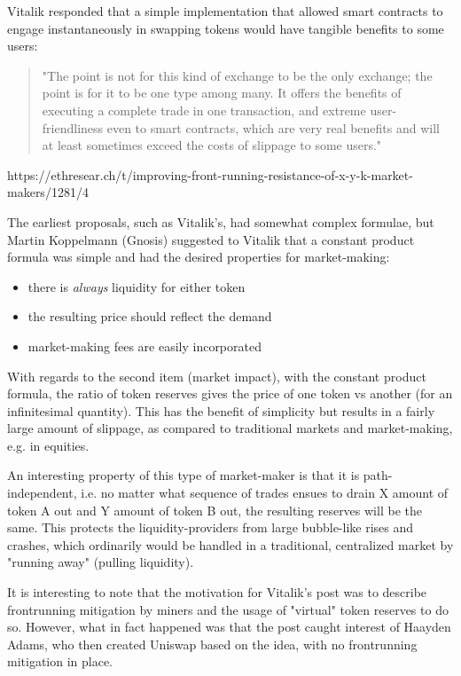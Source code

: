 \documentclass[nohyper]{tufte-handout}
\begin{document}
Vitalik responded that a simple implementation that allowed smart contracts to engage instantaneously in swapping tokens would have tangible benefits to some users:
\begin{quotation}
"The point is not for this kind of exchange to be the only exchange; the point is for it to be one type among many. It offers the benefits of executing a complete trade in one transaction, and extreme user-friendliness even to smart contracts, which are very real benefits and will at least sometimes exceed the costs of slippage to some users."
\end{quotation}
https://ethresear.ch/t/improving-front-running-resistance-of-x-y-k-market-makers/1281/4

The earliest proposals, such as Vitalik's, had somewhat complex formulae, but Martin Koppelmann (Gnosis) suggested to Vitalik that a constant product formula was simple and had the desired properties for market-making:
\begin{itemize}
\setlength\itemsep{-0.25em}
\item there is \emph{always} liquidity for either token 
\item the resulting price should reflect the demand
\item market-making fees are easily incorporated
\end{itemize}

With regards to the second item (market impact), with the constant product formula, the ratio of token reserves gives the price of one token vs another (for an infinitesimal quantity).  This has the benefit of simplicity but results in a fairly large amount of slippage, as compared to traditional markets and market-making, e.g. in equities.

An interesting property of this type of market-maker is that it is path-independent, i.e. no matter what sequence of trades ensues to drain X amount of token A out and Y amount of token B out, the resulting reserves will be the same.  This protects the liquidity-providers from large bubble-like rises and crashes, which ordinarily would be handled in a traditional, centralized market by "running away" (pulling liquidity).  

It is interesting to note that the motivation for Vitalik's post was to describe frontrunning mitigation by miners and the usage of "virtual" token reserves to do so.  However, what in fact happened was that the post caught interest of Haayden Adams, who then created Uniswap based on the idea, with no frontrunning mitigation in place.
\end{document}
